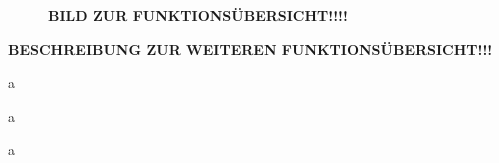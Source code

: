 \documentclass{report}
\begin{document}
\begin{figure}[ht]\label{bild_5}
\centering {}
\caption{\textbf{BILD ZUR FUNKTIONSÜBERSICHT!!!!}}
\end{figure}

{\red \textbf{BESCHREIBUNG ZUR WEITEREN FUNKTIONSÜBERSICHT!!!}}

a

a

a
\end{document}
